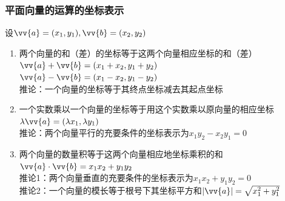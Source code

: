 \subsubsection*{平面向量的运算的坐标表示}
设$\vv{a} = (x_1, y_1), \vv{b} = (x_2, y_2)$
\begin{enumerate}
    \item 两个向量的和（差）的坐标等于这两个向量相应坐标的和（差）\\
    $\vv{a} + \vv{b} = (x_1 + x_2, y_1 + y_2)$ \\
    $\vv{a} - \vv{b} = (x_1 - x_2, y_1 - y_2)$ \\
    推论：一个向量的坐标等于其终点坐标减去其起点坐标
    \item 一个实数乘以一个向量的坐标等于用这个实数乘以原向量的相应坐标 \\
    $\lambda \vv{a} = (\lambda x_1, \lambda y_1)$ \\
    推论：两个向量平行的充要条件的坐标表示为$x_1 y_2 - x_2 y_1 = 0$
    \item 两个向量的数量积等于这两个向量相应地坐标乘积的和 \\
    $\vv{a} \cdot \vv{b} = x_1 x_2 + y_1 y_2$ \\
    推论1：两个向量垂直的充要条件的坐标表示为$x_1 x_2 + y_1 y_2 = 0$ \\
    推论2：一个向量的模长等于根号下其坐标平方和$|\vv{a}| = \sqrt{x^2_1 + y^2_1}$
\end{enumerate}

